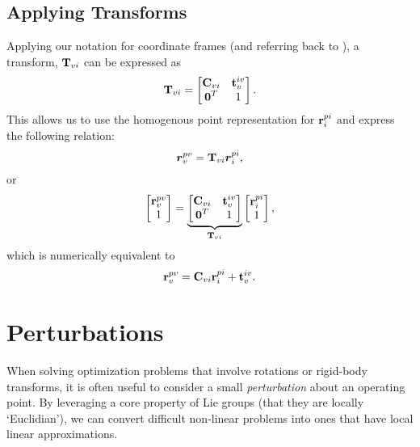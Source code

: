 \subsection{Applying Transforms}
Applying our notation for coordinate frames (and referring back to ), a transform, $\boldsymbol{\mathbf{T}}_{vi}$ can be expressed as 
\begin{equation}
\boldsymbol{\mathbf{T}}_{vi} = \begin{bmatrix} \boldsymbol{\mathbf{C}}_{vi} & \boldsymbol{\mathbf{t}}_v^{iv} \\ \boldsymbol{\mathbf{0}}^T & 1 \end{bmatrix}.
\end{equation}
This allows us to use the homogenous point representation for $\boldsymbol{\mathbf{r}}^{pi}_i$ and express the following relation:
\begin{equation}
	\boldsymbol{r}^{pv}_v = \boldsymbol{\mathbf{T}}_{vi} \boldsymbol{r}^{pi}_i,
\end{equation}
or
\begin{equation}
	\begin{bmatrix} \boldsymbol{\mathbf{r}}^{pv}_v \\ 1 \end{bmatrix} = \underbrace{\begin{bmatrix} \boldsymbol{\mathbf{C}}_{vi} & \boldsymbol{\mathbf{t}}_v^{iv} \\ \boldsymbol{\mathbf{0}}^T & 1 \end{bmatrix}}_{\boldsymbol{\mathbf{T}}_{vi}} \begin{bmatrix} \boldsymbol{\mathbf{r}}^{pi}_i \\ 1 \end{bmatrix},
\end{equation}
which is numerically equivalent to  
\begin{equation}
 \boldsymbol{\mathbf{r}}^{pv}_v =  \boldsymbol{\mathbf{C}}_{vi} \boldsymbol{\mathbf{r}}^{pi}_i + \boldsymbol{\mathbf{t}}_v^{iv}.  
 \end{equation}

\section{Perturbations}

When solving optimization problems that involve rotations or rigid-body transforms, it is often useful to consider a small \textit{perturbation} about an operating point. By leveraging a core property of Lie groups (that they are locally `Euclidian'), we can convert difficult non-linear problems into ones that have local linear approximations.

